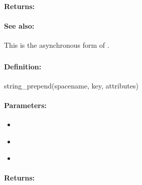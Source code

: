 \paragraph{Returns:}


\paragraph{See also:}  This is the asynchronous form of .

\pagebreak
\subsubsection{}
\label{api:ruby:string_prepend}


\paragraph{Definition:}
\begin{rubycode}
string_prepend(spacename, key, attributes)
\end{rubycode}

\paragraph{Parameters:}
\begin{itemize}[noitemsep]
\item {}\\

\item {}\\

\item {}\\

\end{itemize}

\paragraph{Returns:}


\pagebreak
\subsubsection{}
\label{api:ruby:async_string_prepend}


